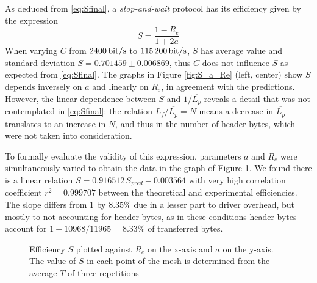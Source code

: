 \documentclass[a4paper, 11pt]{report}
\begin{document}
As deduced from \ref{eq:Sfinal}, a \textit{stop-and-wait} protocol has its efficiency given by the expression
\begin{equation*}
	S = \frac{1-R_e}{1 + 2a}
\end{equation*}
When varying $C$ from $\SI{2400}{\bit/\second}$ to $\SI{115200}{\bit/\second}$, $S$ has average value and standard deviation $S=0.701459\pm0.006869$, thus $C$ does not influence $S$ as expected from \ref{eq:Sfinal}.
The graphs in Figure \ref{fig:S_a_Re} (left, center) show $S$ depends inversely on $a$ and linearly on $R_e$, in agreement with the predictions.
However, the linear dependence between $S$ and $1/\overline{L_p}$ reveals a detail that was not contemplated in \ref{eq:Sfinal}: the relation $L_f/\overline{L_p} = N$ means a decrease in $\overline{L_p}$ translates to an increase in $N$, and thus in the number of header bytes, which were not taken into consideration.

To formally evaluate the validity of this expression, parameters $a$ and $R_e$ were simultaneously varied to obtain the data in the graph of Figure \ref{fig:S_aRe}. We found there is a linear relation $S=0.916512\,S_{pred} - 0.003564$ with very high correlation coefficient $r^2 = 0.999707$ between the theoretical and experimental efficiencies. The slope differs from $1$ by $8.35\%$ due in a lesser part to driver overhead, but mostly to not accounting for header bytes, as in these conditions header bytes account for $1-10968/11965=8.33\%$ of transferred bytes.

\begin{figure}[H]
	\centering
	\caption{Efficiency $S$ plotted against $R_e$ on the x-axis and $a$ on the y-axis. The value of $S$ in each point of the mesh is determined from the average $T$ of three repetitions}\label{fig:S_aRe}
\end{figure}
\end{document}
